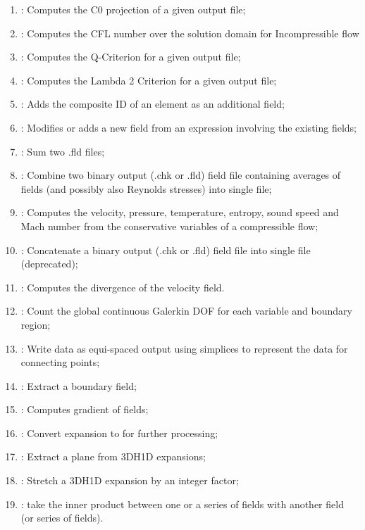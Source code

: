 \begin{enumerate}
\item {}: Computes the C0 projection of a given output file;
\item {}: Computes the CFL number over the solution domain for Incompressible flow
\item {}: Computes the Q-Criterion for a given output file;
\item {}: Computes the Lambda 2 Criterion for a given output file;
\item {}: Adds the composite ID of an element as an additional field;
\item {}: Modifies or adds a new field from an expression involving the existing fields;
\item {}: Sum two .fld files;
\item {}: Combine two \nekpp binary output (.chk or .fld) field file containing averages of fields (and
possibly also Reynolds stresses) into single file;
\item {}: Computes the velocity, pressure, temperature, entropy, sound speed and Mach number from the conservative variables of a compressible flow;
\item {}: Concatenate a \nekpp binary output (.chk or .fld) field file into single file (deprecated);
\item {}: Computes the divergence of the velocity field.
\item {}: Count the global continuous Galerkin DOF for each variable and boundary region;
\item {}: Write data as equi-spaced output using simplices to represent the data for connecting points;
\item {}: Extract a boundary field;
\item {}: Computes gradient of fields;
\item {}: Convert  expansion to  for further processing;
\item {}: Extract a plane from 3DH1D expansions;
\item {}: Stretch a 3DH1D expansion by an integer factor;
\item {}: take the inner product between one or a series of fields with another field (or series of fields).

\end{enumerate}
